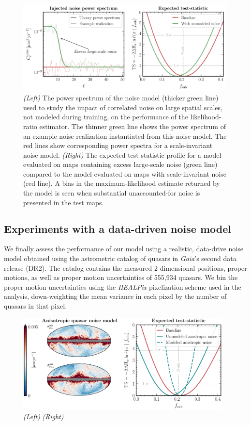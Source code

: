 \documentclass[twocolumn,linenumbers,anonymous]{aastex631}
\newcommand{\package}[1]{\textsl{#1}\xspace}
\newcommand{\healpix}{\package{HEALPix}}
\newcommand{\changes}[1]{{{\color{red}#1}}}
\begin{document}
\begin{figure}[!htbp]
\centering
\includegraphics[width=0.99\textwidth]{lowell_noise}
\caption{\emph{(Left)} The power spectrum of the noise model (thicker green line) used to study the impact of correlated noise on large spatial scales, not modeled during training, on the performance of the likelihood-ratio estimator. The thinner green line shows the power spectrum of an example noise realization instantiated from this noise model. The red lines show corresponding power spectra for a scale-invariant noise model.  \emph{(Right)} The expected  test-statistic profile for a model evaluated on maps containing excess large-scale noise (green line) compared to the model evaluated on maps with scale-invariant noise (red line). A bias in the maximum-likelihood estimate returned by the model is seen when substantial unaccounted-for noise is presented in the test maps.}
\label{fig:noise_test}
\end{figure}

\subsection{Experiments with a data-driven noise model}

\changes{We finally assess the performance of our model using a realistic, data-drive noise model obtained using the astrometric catalog of quasars in \emph{Gaia}'s second data release (DR2). The catalog contains the measured 2-dimensional positions, proper motions, as well as proper motion uncertainties of 555,934 quasars. We bin the proper motion uncertainties using the \healpix pixelization scheme used in the analysis, down-weighting the mean variance in each pixel by the number of quasars in that pixel.}

\begin{figure}[!htbp]
\centering
\includegraphics[width=0.97\textwidth]{anisotropic_noise}
\caption{\changes{\emph{(Left)}  \emph{(Right)}}}
\label{fig:anisotropic_noise}
\end{figure}
    
\end{document}
